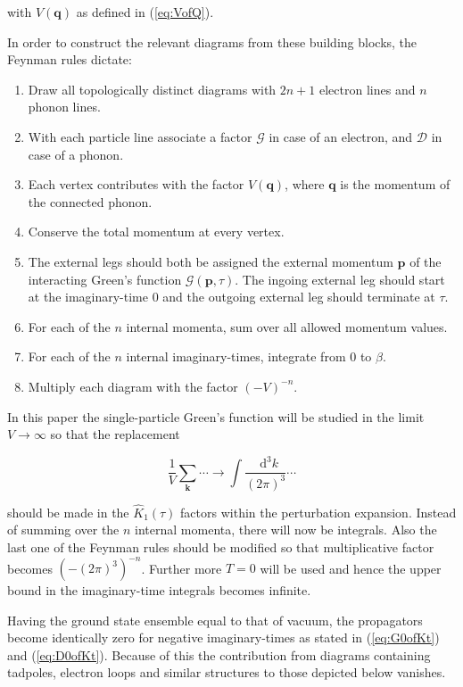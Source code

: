\documentclass[12pt]{report}
\renewcommand{\vec}[1]{\boldsymbol{\mathbf{#1}}}                        %
\newcommand*\diff{\mathop{}\!\mathrm{d}}
\newcommand{\Gt}{\mathcal{G}}
\newcommand{\Dt}{\mathcal{D}}
\begin{document}
with $ V(\vec q) $ as defined in (\ref{eq:VofQ}).

In order to construct the relevant diagrams from these building blocks, the Feynman rules dictate:

\begin{enumerate}
	\item Draw all topologically distinct diagrams with $ 2n + 1 $ electron lines and $ n $ phonon lines.
	\item With each particle line associate a factor $ \Gt $ in case of an electron, and $ \Dt $ in case of a phonon.
	\item Each vertex contributes with the factor $ V(\vec q) $, where $ \vec q $ is the momentum of the connected phonon.
	\item Conserve the total momentum at every vertex.
	\item The external legs should both be assigned the external momentum $ \vec p $ of the interacting Green's function $ \Gt(\vec p, \tau) $. The ingoing external leg should start at the imaginary-time $ 0 $ and the outgoing external leg should terminate at $ \tau $.
	\item For each of the $ n $ internal momenta, sum over all allowed momentum values.
	\item For each of the $ n $ internal imaginary-times, integrate from $ 0 $ to $ \beta $.
	\item Multiply each diagram with the factor $ (-V)^{-n} $.
\end{enumerate}

In this paper the single-particle Green's function will be studied in the limit $ V \rightarrow \infty $ so that the replacement

\begin{equation}
	\frac{1}{V} \sum_{\vec k} \cdots \rightarrow \int \frac{\diff^3k}{(2\pi)^3} \cdots
\end{equation}

should be made in the $ \hat K_1(\tau) $ factors within the perturbation expansion. Instead of summing over the $ n $ internal momenta, there will now be integrals. Also the last one of the Feynman rules should be modified so that multiplicative factor becomes $ (-(2\pi)^3)^{-n} $. Further more $ T = 0 $ will be used and hence the upper bound in the imaginary-time integrals becomes infinite.

Having the ground state ensemble equal to that of vacuum, the propagators become identically zero for negative imaginary-times as stated in (\ref{eq:G0ofKt}) and (\ref{eq:D0ofKt}). Because of this the contribution from diagrams containing tadpoles, electron loops and similar structures to those depicted below vanishes.
\end{document}
